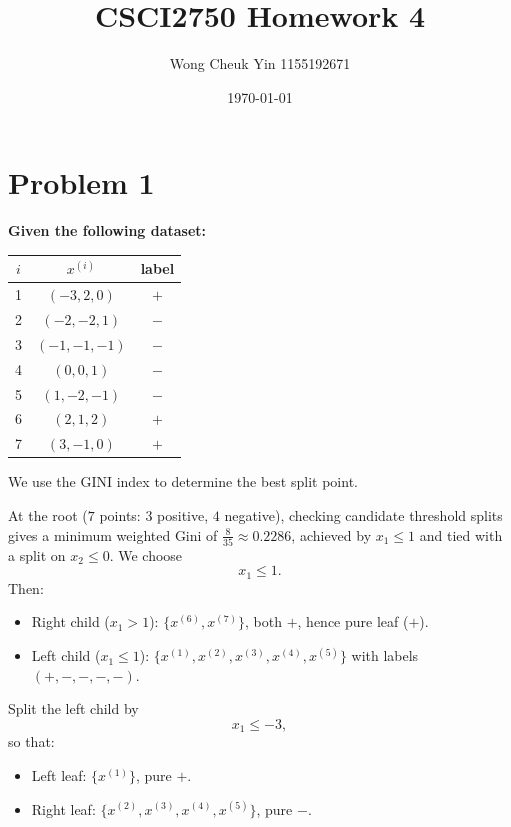 \documentclass[fleqn]{article}
\title{CSCI2750 Homework 4}
\author{Wong Cheuk Yin 1155192671}
\date{\today}
\begin{document}
    \maketitle
    \section{Problem 1}

    \textbf{Given the following dataset:}

    \medskip

    \begin{tabular}{c|c|c}
        \hline
        $i$ & $x^{(i)}$ & label \\
        \hline
        1 & $(-3, 2, 0)$ & $+$ \\
        2 & $(-2, -2, 1)$ & $-$ \\
        3 & $(-1, -1, -1)$ & $-$ \\
        4 & $(0, 0, 1)$ & $-$ \\
        5 & $(1, -2, -1)$ & $-$ \\
        6 & $(2, 1, 2)$ & $+$ \\
        7 & $(3, -1, 0)$ & $+$ \\
        \hline
    \end{tabular}
    
    \medskip
    \noindent We use the GINI index to determine the best split point.

    \medskip
    \noindent At the root ($7$ points: $3$ positive, $4$ negative), checking candidate threshold splits gives a minimum weighted Gini of $\frac{8}{35}\approx 0.2286$, achieved by $x_1\le 1$ and tied with a split on $x_2\le 0$. We choose
    \[
    x_1\le 1.
    \]
    Then:
    \begin{itemize}
        \item Right child ($x_1>1$): $\{x^{(6)},x^{(7)}\}$, both $+$, hence pure leaf ($+$).
        \item Left child ($x_1\le 1$): $\{x^{(1)},x^{(2)},x^{(3)},x^{(4)},x^{(5)}\}$ with labels $(+,-,-,-,-)$.
    \end{itemize}

    \noindent Split the left child by
    \[
    x_1\le -3,
    \]
    so that:
    \begin{itemize}
        \item Left leaf: $\{x^{(1)}\}$, pure $+$.
        \item Right leaf: $\{x^{(2)},x^{(3)},x^{(4)},x^{(5)}\}$, pure $-$.
    \end{itemize}
\end{document}
